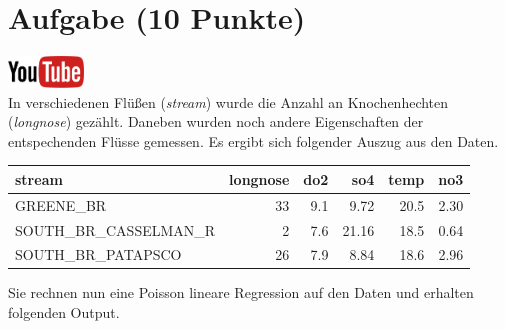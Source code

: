 \documentclass[a4paper, 10pt]{scrartcl}\usepackage[]{graphicx}\usepackage[]{xcolor}
\newenvironment{knitrout}{}{} %
\begin{document}
\clearpage

\section{Aufgabe \hfill (10 Punkte)}

\hfill\href{https://youtu.be/K_28Ne6ladI}{\includegraphics[width =
  2cm]{img/youtube}}\\[1Ex]




In verschiedenen Fl{\"u}{\ss}en (\textit{stream}) wurde die Anzahl an
Knochenhechten (\textit{longnose}) gez{\"a}hlt. Daneben wurden noch andere
Eigenschaften der entspechenden Fl{\"u}sse gemessen. Es ergibt sich folgender
Auszug aus den Daten. 


\begin{knitrout}
\color{fgcolor}\begin{table}[!h]
\centering
\begin{tabular}{lrrrrr}
\toprule
stream & longnose & do2 & so4 & temp & no3\\
\midrule
GREENE\_BR & 33 & 9.1 & 9.72 & 20.5 & 2.30\\
SOUTH\_BR\_CASSELMAN\_R & 2 & 7.6 & 21.16 & 18.5 & 0.64\\
SOUTH\_BR\_PATAPSCO & 26 & 7.9 & 8.84 & 18.6 & 2.96\\
\bottomrule
\end{tabular}
\end{table}

\end{knitrout}


Sie rechnen nun eine Poisson lineare Regression auf den Daten und erhalten
folgenden \Rlogo Output.
\end{document}
